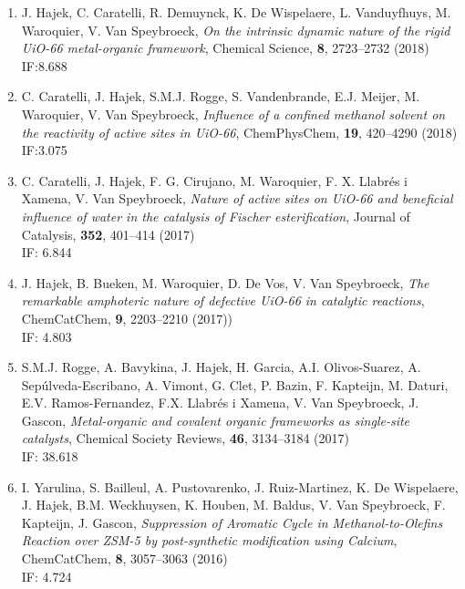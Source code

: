 \begin{enumerate}
\item
J. Hajek, C. Caratelli, R. Demuynck, K. De Wispelaere, L.
Vanduyfhuys, M.
Waroquier, V. Van Speybroeck, \textit{On the intrinsic dynamic nature of the
rigid UiO-66 metal-organic framework},  Chemical Science, \textbf{8}, 2723--2732
(2018)\\ IF:8.688

\item

C. Caratelli, J. Hajek, S.M.J. Rogge, S. Vandenbrande, E.J. Meijer, M.
Waroquier, V. Van Speybroeck, \textit{Influence of a confined methanol solvent on the reactivity of active sites in UiO-66}, ChemPhysChem, \textbf{19}, 420--4290 (2018)\\ IF:3.075 

\item
C. Caratelli, J. Hajek, F. G. Cirujano, M. Waroquier, F. X.
Llabr\'es i Xamena, V. Van Speybroeck, \textit{Nature of active sites on UiO-66
and beneficial influence of water in the catalysis of Fischer esterification},
Journal of Catalysis, \textbf{352}, 401--414 (2017) \\
IF: 6.844

\item

J. Hajek, B. Bueken, M. Waroquier, D. De Vos, V. Van Speybroeck, \textit{The
remarkable amphoteric nature of defective UiO-66 in catalytic reactions},
ChemCatChem, \textbf{9}, 2203--2210 (2017)) \\
IF: 4.803

\item

S.M.J. Rogge, A. Bavykina, J. Hajek, H. Garcia, A.I. Olivos-Suarez, A.
Sep\'ulveda-Escribano, A. Vimont, G. Clet, P. Bazin, F. Kapteijn, M. Daturi,
E.V.
Ramos-Fernandez, F.X. Llabr\'es i Xamena, V. Van Speybroeck, J. Gascon,
\textit{Metal-organic and covalent organic frameworks as single-site catalysts}, Chemical Society Reviews, \textbf{46}, 3134--3184 (2017) \\
IF: 38.618

\item

I. Yarulina, S. Bailleul, A. Pustovarenko, J. Ruiz-Martinez, K. De Wispelaere,
J. Hajek, B.M. Weckhuysen, K. Houben, M. Baldus, V. Van Speybroeck, F. Kapteijn,
J. Gascon, \textit{Suppression of Aromatic Cycle in Methanol-to-Olefins Reaction over ZSM-5 by post-synthetic modification using Calcium}, ChemCatChem, \textbf{8}, 3057--3063 (2016) \\
IF: 4.724


\end{enumerate}
